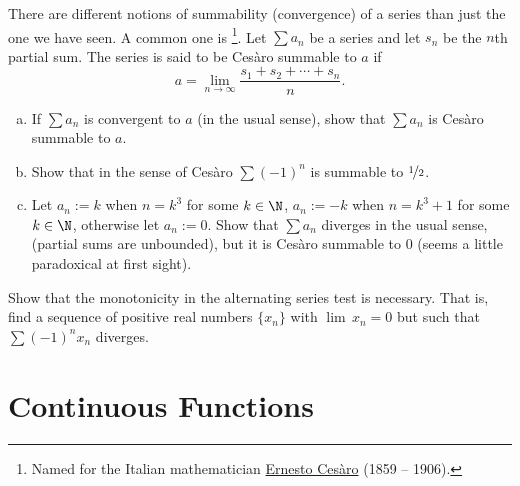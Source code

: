 \documentclass[12pt]{book}
\begin{document}
\begin{exnote}
There are different notions of summability (convergence)
of a series
than just the one we have seen.
A common one is \emph{}%
\footnote{Named for the Italian mathematician
\href{http://en.wikipedia.org/wiki/Ernesto_Ces\%C3\%A0ro}{Ernesto Ces{\`a}ro}
(1859 -- 1906).}.
Let $\sum a_n$ be a series
and let $s_n$ be the $n$th partial sum.
The series is said to
be Ces{\`a}ro summable to $a$ if
\begin{equation*}
a = \lim_{n\to \infty} \frac{s_1 + s_2 + \cdots + s_n}{n} .
\end{equation*}
\end{exnote}

\begin{exercise}[Challenging]
\begin{enumerate}[a)]
 \item If $\sum a_n$ is convergent to $a$ (in the usual sense), show that
$\sum a_n$ is Ces{\`a}ro summable to $a$.
  \item Show that in the sense of Ces{\`a}ro $\sum {(-1)}^n$ is summable to
$\nicefrac{1}{2}$.
   \item Let $a_n := k$ when $n = k^3$ for some $k \in \N$,
$a_n := -k$ when $n = k^3+1$ for some $k \in \N$,
otherwise
let $a_n := 0$.
Show that $\sum a_n$ diverges in the usual sense,
(partial sums are unbounded), but it is
Ces{\`a}ro summable to 0 (seems a little paradoxical at first sight).
\end{enumerate}
\end{exercise}

\begin{exercise}
Show that the monotonicity in the alternating series test
is necessary.
That is, find a sequence of positive real numbers
$\{ x_n \}$ with $\lim\, x_n = 0$ but such that
$\sum {(-1)}^n x_n$ diverges.
\end{exercise}



\chapter{Continuous Functions} \label{lim:chapter}

\end{document}
